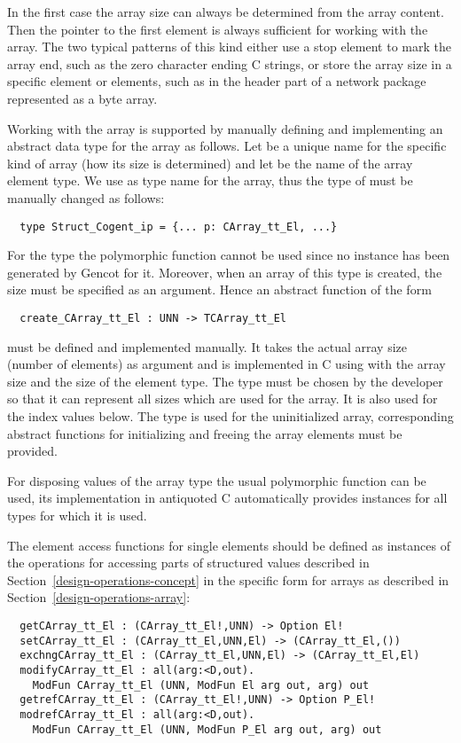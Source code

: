 In the first case the array size can always be determined from the array content. Then the pointer to the first 
element is always sufficient for working with the array. The two typical patterns of this kind either use a 
stop element to mark the array end, such as the zero character ending C strings, or store the array size in a
specific element or elements, such as in the header part of a network package represented as a byte array.

Working with the array is supported by manually defining and implementing an abstract data type for the array as follows.
Let  be a unique name for the specific kind of array (how its size is determined) and let  be the
name of the array element type. We use  as type name for the array, thus the 
type of  must be manually changed as follows:
\begin{verbatim}
  type Struct_Cogent_ip = {... p: CArray_tt_El, ...}
\end{verbatim}

For the type  the polymorphic function  cannot be used since no instance has been
generated by Gencot for it. Moreover, when an array of this type is created, the size must be specified as an argument.
Hence an abstract function of the form
\begin{verbatim}
  create_CArray_tt_El : UNN -> TCArray_tt_El
\end{verbatim}
must be defined and implemented manually. It takes the actual array size (number of elements) as argument and is
implemented in C using  with the array size and the size of the element type. The type  must be
chosen by the developer so that it can represent all sizes which are used for the array. It is also used for the index
values below. The type  is used for the uninitialized array, corresponding abstract functions 
for initializing and freeing the array elements must be provided.

For disposing values of the array type the usual polymorphic function  can be used, its implementation in
antiquoted C automatically provides instances for all types for which it is used.

The element access functions for single elements should be defined as instances of the operations for accessing parts 
of structured values described in Section~\ref{design-operations-concept} in the specific form for arrays as described
in Section~\ref{design-operations-array}:
\begin{verbatim}
  getCArray_tt_El : (CArray_tt_El!,UNN) -> Option El!
  setCArray_tt_El : (CArray_tt_El,UNN,El) -> (CArray_tt_El,())
  exchngCArray_tt_El : (CArray_tt_El,UNN,El) -> (CArray_tt_El,El)
  modifyCArray_tt_El : all(arg:<D,out). 
    ModFun CArray_tt_El (UNN, ModFun El arg out, arg) out
  getrefCArray_tt_El : (CArray_tt_El!,UNN) -> Option P_El!
  modrefCArray_tt_El : all(arg:<D,out). 
    ModFun CArray_tt_El (UNN, ModFun P_El arg out, arg) out
\end{verbatim}

